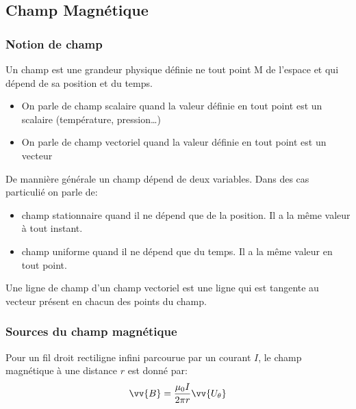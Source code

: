 \subsection{Champ Magnétique}

\subsubsection{Notion de champ}

\begin{definition}
    Un champ est une grandeur physique définie ne tout point M de l'espace et qui dépend de sa position et du temps.
    \begin{itemize}
        \item On parle de champ scalaire quand la valeur définie en tout point est un scalaire (température, pression\dots)
        \item On parle de champ vectoriel quand la valeur définie en tout point est un vecteur
    \end{itemize}
\end{definition}

\begin{definition}
    De mannière générale un champ dépend de deux variables. Dans des cas particulié on parle de:
    \begin{itemize}
        \item champ stationnaire quand il ne dépend que de la position. Il a la même valeur à tout instant.
        \item champ uniforme quand il ne dépend que du temps. Il a la même valeur en tout point.
    \end{itemize}
\end{definition}

\begin{definition}
    Une ligne de champ d'un champ vectoriel est une ligne qui est tangente au vecteur présent en chacun des points du champ.
\end{definition}

\subsubsection{Sources du champ magnétique}

\begin{proposition}
    Pour un fil droit rectiligne infini parcourue par un courant $I$, le champ magnétique à une distance $r$ est donné par:
    \[ \vv{B} = \frac{\mu_{0} I}{2\pi r} \vv{U_{\theta}}\]
\end{proposition}

